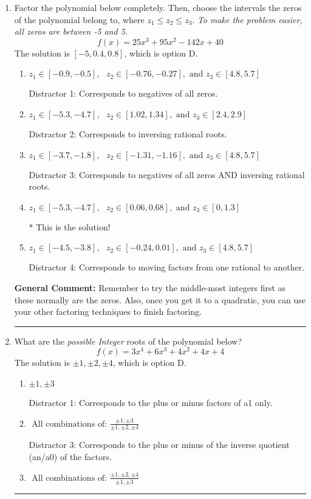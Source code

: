 \documentclass{extbook}[14pt]
\newcommand{\litem}[1]{\item #1

\rule{\textwidth}{0.4pt}}
\begin{document}
\begin{enumerate}\litem{
Factor the polynomial below completely. Then, choose the intervals the zeros of the polynomial belong to, where $z_1 \leq z_2 \leq z_3$. \textit{To make the problem easier, all zeros are between -5 and 5.}
\[ f(x) = 25x^{3} +95 x^{2} -142 x + 40 \]The solution is \( [-5, 0.4, 0.8] \), which is option D.\begin{enumerate}[label=\Alph*.]
\item \( z_1 \in [-0.9, -0.5], \text{   }  z_2 \in [-0.76, -0.27], \text{   and   } z_3 \in [4.8, 5.7] \)

 Distractor 1: Corresponds to negatives of all zeros.
\item \( z_1 \in [-5.3, -4.7], \text{   }  z_2 \in [1.02, 1.34], \text{   and   } z_3 \in [2.4, 2.9] \)

 Distractor 2: Corresponds to inversing rational roots.
\item \( z_1 \in [-3.7, -1.8], \text{   }  z_2 \in [-1.31, -1.16], \text{   and   } z_3 \in [4.8, 5.7] \)

 Distractor 3: Corresponds to negatives of all zeros AND inversing rational roots.
\item \( z_1 \in [-5.3, -4.7], \text{   }  z_2 \in [0.06, 0.68], \text{   and   } z_3 \in [0, 1.3] \)

* This is the solution!
\item \( z_1 \in [-4.5, -3.8], \text{   }  z_2 \in [-0.24, 0.01], \text{   and   } z_3 \in [4.8, 5.7] \)

 Distractor 4: Corresponds to moving factors from one rational to another.
\end{enumerate}

\textbf{General Comment:} Remember to try the middle-most integers first as these normally are the zeros. Also, once you get it to a quadratic, you can use your other factoring techniques to finish factoring.
}
\litem{
What are the \textit{possible Integer} roots of the polynomial below?
\[ f(x) = 3x^{4} +6 x^{3} +4 x^{2} +4 x + 4 \]The solution is \( \pm 1,\pm 2,\pm 4 \), which is option D.\begin{enumerate}[label=\Alph*.]
\item \( \pm 1,\pm 3 \)

 Distractor 1: Corresponds to the plus or minus factors of a1 only.
\item \( \text{ All combinations of: }\frac{\pm 1,\pm 3}{\pm 1,\pm 2,\pm 4} \)

 Distractor 3: Corresponds to the plus or minus of the inverse quotient (an/a0) of the factors. 
\item \( \text{ All combinations of: }\frac{\pm 1,\pm 2,\pm 4}{\pm 1,\pm 3} \)


\end{enumerate}}
\end{enumerate}
\end{document}
